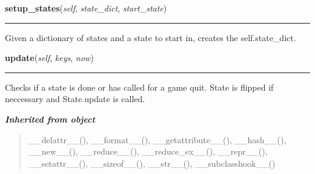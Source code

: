     \vspace{0.5ex}

\hspace{.8\funcindent}\begin{boxedminipage}{\funcwidth}

    \raggedright \textbf{setup\_states}(\textit{self}, \textit{state\_dict}, \textit{start\_state})

    \vspace{-1.5ex}

    \rule{\textwidth}{0.5\fboxrule}
\setlength{\parskip}{2ex}
    Given a dictionary of states and a state to start in, creates the 
    self.state\_dict.

\setlength{\parskip}{1ex}
    \end{boxedminipage}

    \label{pygame-asteroids:state_machine:StateMachine:update}

    \vspace{0.5ex}

\hspace{.8\funcindent}\begin{boxedminipage}{\funcwidth}

    \raggedright \textbf{update}(\textit{self}, \textit{keys}, \textit{now})

    \vspace{-1.5ex}

    \rule{\textwidth}{0.5\fboxrule}
\setlength{\parskip}{2ex}
    Checks if a state is done or has called for a game quit. State is 
    flipped if neccessary and State.update is called.

\setlength{\parskip}{1ex}
    \end{boxedminipage}


\large{\textbf{\textit{Inherited from object}}}

\begin{quote}
\_\_delattr\_\_(), \_\_format\_\_(), \_\_getattribute\_\_(), \_\_hash\_\_(), \_\_new\_\_(), \_\_reduce\_\_(), \_\_reduce\_ex\_\_(), \_\_repr\_\_(), \_\_setattr\_\_(), \_\_sizeof\_\_(), \_\_str\_\_(), \_\_subclasshook\_\_()
\end{quote}


